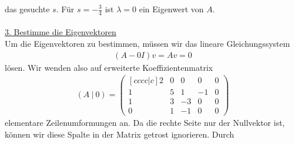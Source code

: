 das gesuchte $s$.
Für $s = -\frac{3}{4}$ ist $\lambda = 0$ ein Eigenwert von $A$.
\\
\\
\underline{3. Bestimme die Eigenvektoren}\\
Um die Eigenvektoren zu bestimmen, müssen wir das lineare Gleichungssystem
\begin{align*}
(A - 0 I) v = A v = 0
\end{align*}
lösen.
Wir wenden also auf erweiterte Koeffizientenmatrix
\begin{align*}
(A \  | \ 0 ) =
\begin{pmatrix}[cccc|c]
2 & 0 &0 & 0 & 0 \\
1 & 5 & 1  & -1 & 0\\
1 & 3 & -3 & 0 & 0  \\
0 & 1 & -1 & 0 & 0
\end{pmatrix}
\end{align*}
elementare Zeilenumformungen an.
Da die rechte Seite nur der Nullvektor ist, können wir diese Spalte in der Matrix getrost ignorieren.
Durch
